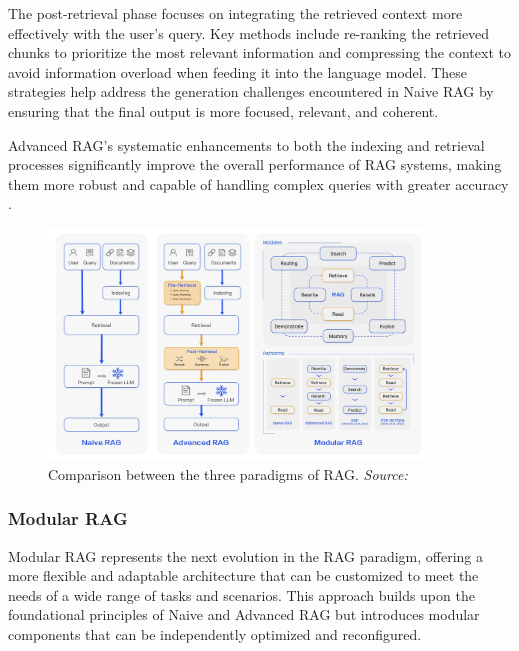 The post-retrieval phase focuses on integrating the retrieved context more effectively with the user’s query. Key methods include re-ranking the retrieved chunks to prioritize the most relevant information and compressing the context to avoid information overload when feeding it into the language model. These strategies help address the generation challenges encountered in Naive RAG by ensuring that the final output is more focused, relevant, and coherent.

Advanced RAG’s systematic enhancements to both the indexing and retrieval processes significantly improve the overall performance of RAG systems, making them more robust and capable of handling complex queries with greater accuracy \cite{gao2023retrieval}.

\begin{figure}[h]
    \centering
    \includegraphics[width=0.9\textwidth]{images/llms/naive-adv-modular-rag.png}
    \caption{Comparison between the three paradigms of RAG. \textit{Source:} \cite{gao2023retrieval}}
    \label{fig:rag_paradigms}
\end{figure}

\subsubsection{Modular RAG}

Modular RAG represents the next evolution in the RAG paradigm, offering a more flexible and adaptable architecture that can be customized to meet the needs of a wide range of tasks and scenarios. This approach builds upon the foundational principles of Naive and Advanced RAG but introduces modular components that can be independently optimized and reconfigured.

